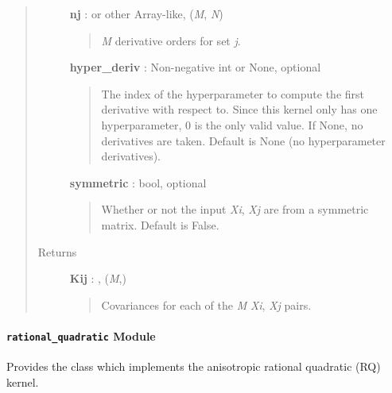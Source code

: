 \documentclass[letterpaper,10pt,english]{sphinxmanual}
\begin{document}
\begin{fulllineitems}
\begin{fulllineitems}
\begin{quote}
\begin{description}
\textbf{nj} :  or other Array-like, (\emph{M}, \emph{N})
\begin{quote}

\emph{M} derivative orders for set \emph{j}.
\end{quote}

\textbf{hyper\_deriv} : Non-negative int or None, optional
\begin{quote}

The index of the hyperparameter to compute the first derivative
with respect to. Since this kernel only has one hyperparameter, 0
is the only valid value. If None, no derivatives are taken. Default
is None (no hyperparameter derivatives).
\end{quote}

\textbf{symmetric} : bool, optional
\begin{quote}

Whether or not the input \emph{Xi}, \emph{Xj} are from a symmetric matrix.
Default is False.
\end{quote}

\item[{Returns }] \leavevmode
\textbf{Kij} : , (\emph{M},)
\begin{quote}

Covariances for each of the \emph{M} \emph{Xi}, \emph{Xj} pairs.
\end{quote}

\end{description}\end{quote}

\end{fulllineitems}


\end{fulllineitems}



\paragraph{\texttt{rational\_quadratic} Module}
\label{gptools.kernel:module-gptools.kernel.rational_quadratic}\label{gptools.kernel:rational-quadratic-module}
Provides the {\hyperref[gptools.kernel:gptools.kernel.rational_quadratic.RationalQuadraticKernel]{}} class which implements the anisotropic rational quadratic (RQ) kernel.
\end{document}
